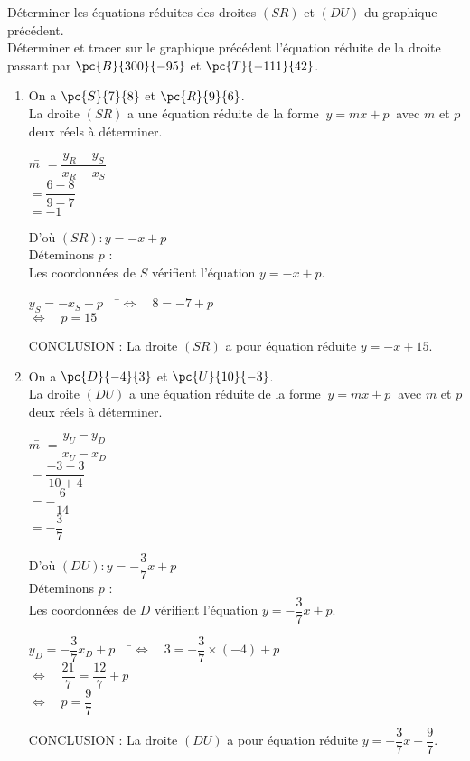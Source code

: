 \documentclass[a4paper,11pt,exos]{nsi} %
\begin{document}
\begin {exercice}
Déterminer les équations réduites des droites $(SR)$ et $(DU)$ du graphique précédent.\\

Déterminer et tracer sur le graphique précédent l'équation réduite de la droite passant par $\pc{B}{300}{-95}$ et $\pc{T}{-111}{42}$.
\end {exercice}

\begin{enumerate}[label=\textbullet]
    \item On a $\pc{S}{7}{8}$ et $\pc{R}{9}{6}$.\\
    La droite $(SR)$ a une équation réduite de la forme $\ y=mx+p\ $ avec $m$ et $p$ deux réels à déterminer.
    \begin{tabbing}
        $m$\=   $=\dfrac{y_R-y_S}{x_R-x_S}$\\[.5em]
        \>  $=\dfrac{6-8}{9-7}$\\[.5em]
        \>  $=-1$
    \end{tabbing}
    D'où $(SR) : y=-x+p$\\
    Déteminons $p$ :\\
    Les coordonnées de $S$ vérifient l'équation $y=-x+p$.
    \begin{tabbing}
        $y_S=-x_S+p\quad$   \=$\iff\quad 8=-7+p$\\
        \>  $\iff\quad p=15$
    \end{tabbing}
    CONCLUSION : La droite $(SR)$ a pour équation réduite $y=-x+15$.
    
    \item On a $\pc{D}{-4}{3}$ et $\pc{U}{10}{-3}$.\\
    La droite $(DU)$ a une équation réduite de la forme $\ y=mx+p\ $ avec $m$ et $p$ deux réels à déterminer.
    \begin{tabbing}
        $m$\=   $=\dfrac{y_U-y_D}{x_U-x_D}$\\[.5em]
        \>  $=\dfrac{-3-3}{10+4}$\\[.5em]
        \>  $=-\dfrac{6}{14}$\\[.5em]
        \>  $=-\dfrac{3}{7}$
    \end{tabbing}
    D'où $(DU) : y=-\dfrac{3}{7}x+p$\\
    Déteminons $p$ :\\
    Les coordonnées de $D$ vérifient l'équation $y=-\dfrac{3}{7}x+p$.
    \begin{tabbing}
        $y_D=-\dfrac{3}{7}x_D+p\quad$   \=$\iff\quad 3=-\dfrac{3}{7}\times (-4)+p$\\[.5em]
        \>  $\iff\quad \dfrac{21}{7}=\dfrac{12}{7}+p$\\[.5em]
        \>  $\iff\quad  p=\dfrac{9}{7}$
    \end{tabbing}
    CONCLUSION : La droite $(DU)$ a pour équation réduite $y=-\dfrac{3}{7}x+\dfrac{9}{7}$.


\end{enumerate}
\end{document}
